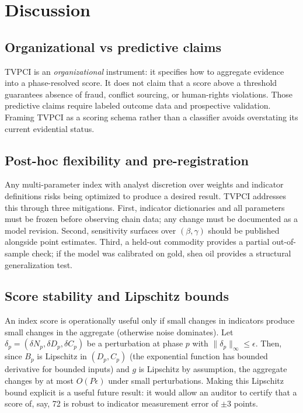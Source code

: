 \documentclass[12pt]{article}
\begin{document}
\section{Discussion}\label{discussion}

\subsection{Organizational vs predictive claims}\label{organizational-vs-predictive-claims}

TVPCI is an \emph{organizational} instrument: it specifies how to
aggregate evidence into a phase-resolved score. It does not claim that a
score above a threshold guarantees absence of fraud, conflict sourcing,
or human-rights violations. Those predictive claims require labeled
outcome data and prospective validation. Framing TVPCI as a scoring
schema rather than a classifier avoids overstating its current
evidential status.

\subsection{Post-hoc flexibility and pre-registration}\label{post-hoc-flexibility-and-pre-registration}

Any multi-parameter index with analyst discretion over weights and
indicator definitions risks being optimized to produce a desired result.
TVPCI addresses this through three mitigations. First, indicator
dictionaries and all parameters must be frozen before observing chain
data; any change must be documented as a model revision. Second,
sensitivity surfaces over \((\beta, \gamma)\) should be published
alongside point estimates. Third, a held-out commodity provides a
partial out-of-sample check; if the model was calibrated on gold, shea
oil provides a structural generalization test.

\subsection{Score stability and Lipschitz bounds}\label{score-stability-and-lipschitz-bounds}

An index score is operationally useful only if small changes in
indicators produce small changes in the aggregate (otherwise noise
dominates). Let \(\delta_p = (\delta N_p, \delta D_p, \delta C_p)\) be a
perturbation at phase \(p\) with \(\|\delta_p\|_\infty \leq \epsilon\).
Then, since \(B_p\) is Lipschitz in \((D_p, C_p)\) (the exponential
function has bounded derivative for bounded inputs) and \(g\) is
Lipschitz by assumption, the aggregate changes by at most
\(O(P \epsilon)\) under small perturbations. Making this Lipschitz bound
explicit is a useful future result: it would allow an auditor to certify
that a score of, say, 72 is robust to indicator measurement error of
\(\pm 3\) points.
\end{document}
